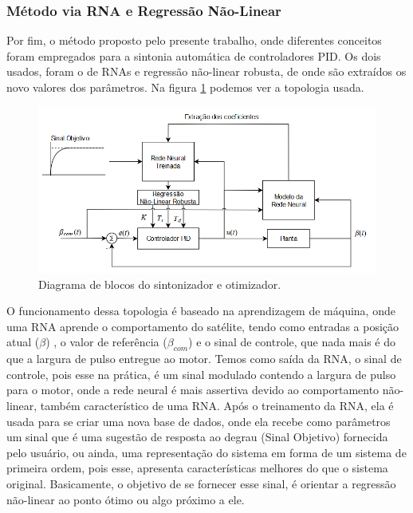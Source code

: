 \subsubsection{Método via RNA e Regressão Não-Linear}

Por fim, o método proposto pelo presente trabalho, onde diferentes conceitos foram empregados para a sintonia automática de controladores PID. Os dois usados, foram o de RNAs e regressão não-linear robusta, de onde são extraídos os novo valores dos parâmetros. Na figura \ref{fig:neural_regression} podemos ver a topologia usada.

\begin{figure}[H]
  \caption{Diagrama de blocos do sintonizador e otimizador.}
  \begin{center}
      \includegraphics[scale=.65]{metodologia/img/neural_regression}
  \end{center}
  \label{fig:neural_regression}
\end{figure}

O funcionamento dessa topologia é baseado na aprendizagem de máquina, onde uma RNA aprende o comportamento do satélite, tendo como entradas a posição atual ($\beta$) , o valor de referência ($\beta_{com}$) e o sinal de controle, que nada mais é do que a largura de pulso entregue ao motor. Temos como saída da RNA, o sinal de controle, pois esse na prática, é um sinal modulado contendo a largura de pulso para o motor, onde a rede neural é mais assertiva devido ao comportamento não-linear, também característico de uma RNA. Após o treinamento da RNA, ela é usada para se criar uma nova base de dados, onde ela recebe como parâmetros um sinal que é uma sugestão de resposta ao degrau (Sinal Objetivo) fornecida pelo usuário, ou ainda, uma representação do sistema em forma de um sistema de primeira ordem, pois esse, apresenta características melhores do que o sistema original. Basicamente, o objetivo de se fornecer esse sinal, é orientar a regressão não-linear ao ponto ótimo ou algo próximo a ele.

